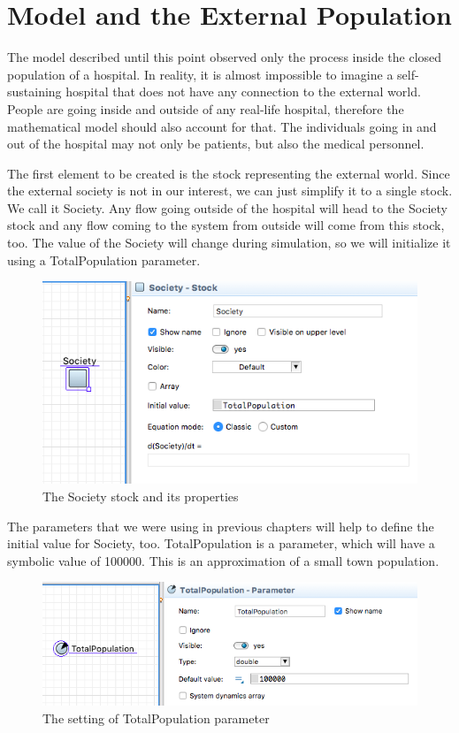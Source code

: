 \section{Model and the External Population}

The model described until this point observed only the process inside the closed population of a hospital. In reality, it is almost impossible to imagine a self-sustaining hospital that does not have any connection to the external world. People are going inside and outside of any real-life hospital, therefore the mathematical model should also account for that. The individuals going in and out of the hospital may not only be patients, but also the medical personnel.

The first element to be created is the stock representing the external world. Since the external society is not in our interest, we can just simplify it to a single stock. We call it Society. Any flow going outside of the hospital will head to the Society stock and any flow coming to the system from outside will come from this stock, too. The value of the Society will change during simulation, so we will initialize it using a TotalPopulation parameter.

\begin{figure}[H]
  \centering
  \includegraphics[height=0.4\textwidth]{img/screens/society/society1}
  \caption{The Society stock and its properties}
\end{figure}

The parameters that we were using in previous chapters will help to define the initial value for Society, too. TotalPopulation is a parameter, which will have a symbolic value of 100000. This is an approximation of a small town population.

\begin{figure}[H]
  \centering
  \includegraphics[height=0.3\textwidth]{img/screens/society/society2}
  \caption{The setting of TotalPopulation parameter}
\end{figure}


